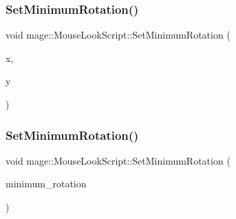 \hypertarget{classmage_1_1_mouse_look_script_a27b21afa03d6c5cba9b206beb1a12533}{}\label{classmage_1_1_mouse_look_script_a27b21afa03d6c5cba9b206beb1a12533} 
\subsubsection{\texorpdfstring{Set\+Minimum\+Rotation()}{SetMinimumRotation()}\hspace{0.1cm}{\footnotesize\ttfamily [1/4]}}
{\footnotesize\ttfamily void mage\+::\+Mouse\+Look\+Script\+::\+Set\+Minimum\+Rotation (\begin{DoxyParamCaption}\item[{float}]{x,  }\item[{float}]{y }\end{DoxyParamCaption})\hspace{0.3cm}{\ttfamily [noexcept]}}

\hypertarget{classmage_1_1_mouse_look_script_a85eff477d2a3a98330193d466c6e54a0}{}\label{classmage_1_1_mouse_look_script_a85eff477d2a3a98330193d466c6e54a0} 
\subsubsection{\texorpdfstring{Set\+Minimum\+Rotation()}{SetMinimumRotation()}\hspace{0.1cm}{\footnotesize\ttfamily [2/4]}}
{\footnotesize\ttfamily void mage\+::\+Mouse\+Look\+Script\+::\+Set\+Minimum\+Rotation (\begin{DoxyParamCaption}\item[{const X\+M\+F\+L\+O\+A\+T2 \&}]{minimum\+\_\+rotation }\end{DoxyParamCaption})\hspace{0.3cm}{\ttfamily [noexcept]}}

\hypertarget{classmage_1_1_mouse_look_script_ac7e0fe75ff9e16b34ba53cb1a96744e9}{}\label{classmage_1_1_mouse_look_script_ac7e0fe75ff9e16b34ba53cb1a96744e9} 
